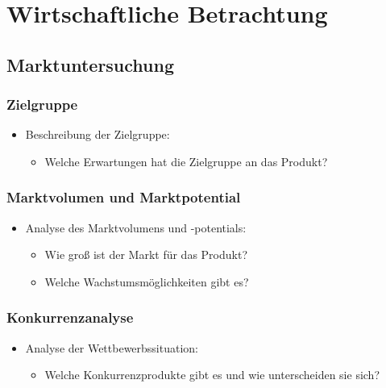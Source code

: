 
\section{Wirtschaftliche Betrachtung}\label{wirtschaftliche-betrachtung}

\subsection{Marktuntersuchung}\label{marktuntersuchung}

\subsubsection{Zielgruppe}\label{zielgruppe}

\begin{itemize}
\item
  Beschreibung der Zielgruppe:

  \begin{itemize}
  
  \item
    Welche Erwartungen hat die Zielgruppe an das Produkt?
  \end{itemize}
\end{itemize}

\subsubsection{Marktvolumen und Marktpotential}\label{marktvolumen-und-marktpotential}

\begin{itemize}
\item
  Analyse des Marktvolumens und -potentials:

  \begin{itemize}
  \item
    Wie groß ist der Markt für das Produkt?
  \item
    Welche Wachstumsmöglichkeiten gibt es?
  \end{itemize}
\end{itemize}

\subsubsection{Konkurrenzanalyse}\label{konkurrenzanalyse}

\begin{itemize}
\item
  Analyse der Wettbewerbssituation:

  \begin{itemize}
  
  \item
    Welche Konkurrenzprodukte gibt es und wie unterscheiden sie sich?
  \end{itemize}
\end{itemize}

